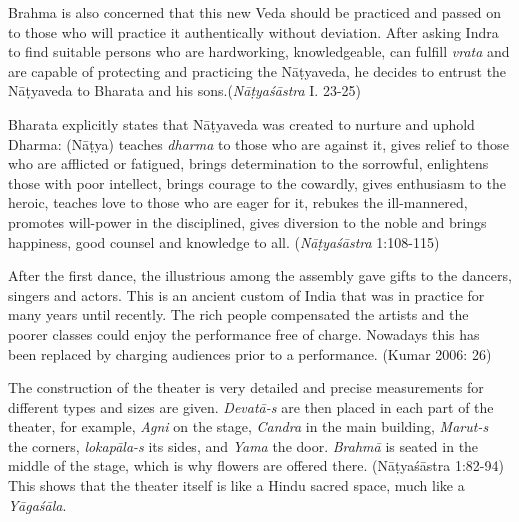 Brahma is also concerned that this new Veda should be practiced and passed on to those who will practice it authentically without deviation. After asking Indra to find suitable persons who are hardworking, knowledgeable, can fulfill \textit{vrata} and are capable of protecting and practicing the Nāṭyaveda, he decides to entrust the Nāṭyaveda to Bharata and his sons.(\textit{Nāṭyaśāstra} I. 23-25)

Bharata explicitly states that Nāṭyaveda was created to nurture and uphold Dharma: (Nāṭya) teaches \textit{dharma} to those who are against it, gives relief to those who are afflicted or fatigued, brings determination to the sorrowful, enlightens those with poor intellect, brings courage to the cowardly, gives enthusiasm to the heroic, teaches love to those who are eager for it, rebukes the ill-mannered, promotes will-power in the disciplined, gives diversion to the noble and brings happiness, good counsel and knowledge to all. (\textit{Nāṭyaśāstra} 1:108-115)

After the first dance, the illustrious among the assembly gave gifts to the dancers, singers and actors. This is an ancient custom of India that was in practice for many years until recently. The rich people compensated the artists and the poorer classes could enjoy the performance free of charge. Nowadays this has been replaced by charging audiences prior to a performance. (Kumar 2006: 26)

The construction of the theater is very detailed and precise measurements for different types and sizes are given. \textit{Devatā-s} are then placed in each part of the theater, for example, \textit{Agni} on the stage, \textit{Candra }in the main building, \textit{Marut-s} the corners, \textit{lokapāla-s} its sides, and \textit{Yama} the door. \textit{Brahmā} is seated in the middle of the stage, which is why flowers are offered there. (Nāṭyaśāstra 1:82-94) This shows that the theater itself is like a Hindu sacred space, much like a \textit{Yāgaśāla}.

